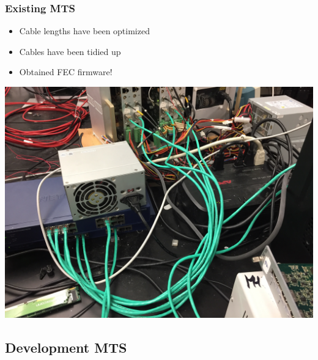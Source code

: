 \documentclass[aspectratio=169]{beamer}
\begin{document}
\begin{frame}

  \frametitle{Existing MTS}

  \begin{itemize}
    \item Cable lengths have been optimized
    \item Cables have been tidied up
    \item Obtained FEC firmware!
  \end{itemize}


    \begin{center}
      \includegraphics[scale=0.06]{mtsCables.png}
    \end{center}    

\end{frame}



\subsection{Development MTS}
\end{document}
